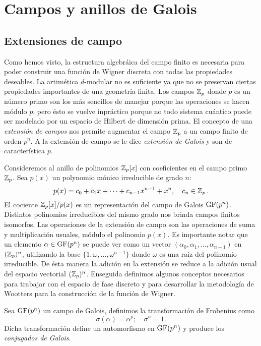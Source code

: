   \section{Campos y anillos de Galois}

  \subsection{Extensiones de campo}

  Como hemos visto, la estructura algebráica del campo
  finito es necesaria para poder construir una función de
  Wigner discreta con todas las propiedades deseables. La
  artimética $d$-modular no es suficiente ya que no se
  preservan ciertas propiedades importantes de una geometría
  finita. Los campos $\operatorname{\mathbb{Z}}_p$ donde $p$ es un número primo son
  los más sencillos de manejar porque las operaciones se
  hacen módulo $p$, pero ésto se vuelve inpráctico porque no
  todo sistema cuántico puede ser modelado por un espacio de
  Hilbert de dimensión prima. El concepto de una
  \textit{extensión de campos} nos permite augmentar el
  campo $\operatorname{\mathbb{Z}}_p$ a un campo finito de orden $p^{n}$. A la
  extensión de campo se le dice \textit{extensión de Galois}
  y son de característica $p$.

  Consideremos al anillo de polinomios $\operatorname{\mathbb{Z}}_p[x]$ con
  coeficientes en el campo primo $\operatorname{\mathbb{Z}}_p$. Sea $p(x)$ un
  polynomio mónico irreducible de grado $n$:
  \begin{equation}
    p(x)
    = c_0 + c_1 x + \cdots + c_{n-1} x^{n-1} + x^{n},
    \quad c_n \in \operatorname{\mathbb{Z}}_p.
  \end{equation}
  El cociente $\operatorname{\mathbb{Z}}_p[x] / p(x)$ es un representación del
  campo de Galois $\operatorname{GF}(p^{n})$. Distintos polinomios
  irreducibles del mismo grado nos brinda campos finitos
  isomorfos. Las operaciones de la extensión de campo son
  las operaciones de suma y multiplicación usuales, módulo
  el polinomio $p(x)$. Es importante notar que un elemento
  $\alpha \in \operatorname{GF}(p^{n})$ se puede ver como un vector
  $(\alpha_0, \alpha_1, \ldots, \alpha_{n-1})$ en
  $(\operatorname{\mathbb{Z}}_p)^{n}$, utilizando la base
  $\{1,\omega,\ldots,\omega^{n-1}\}$ donde $\omega$ es una
  raíz del polinomio irreducible. De ésta manera la adición
  en la extensión se reduce a la adición usual del espacio
  vectorial $(\operatorname{\mathbb{Z}}_p)^{n}$. Enseguida definimos algunos
  conceptos necesarios para trabajar con el espacio de fase
  discreto y para desarrollar la metodología de Wootters
  para la construcción de la función de Wigner.

  \begin{definition}
    Sea $\operatorname{GF}(p^{n})$ un campo de Galois, definimos la
    transformación de Frobenius como
    \begin{equation}
      \sigma(\alpha) = \alpha^{p};
      \quad
      \sigma^{n} = 1.
    \end{equation}
    Dicha transformación define un automorfismo en
    $\operatorname{GF}(p^{n})$ y produce los \textit{conjugados de
    Galois}.
  \end{definition}

